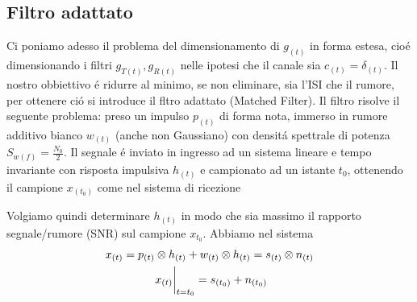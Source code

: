     \subsection{Filtro adattato}
        Ci poniamo adesso il problema del dimensionamento di $g_{(t)}$ in forma estesa, cioé
        dimensionando i filtri $g_{T(t)},g_{R(t)}$ nelle ipotesi che il canale sia $c_{(t)} = \delta_{(t)}$. 
        Il nostro obbiettivo é ridurre al minimo, se non eliminare, sia l'ISI che il rumore, per ottenere ció si introduce
        il fltro adattato (Matched Filter). Il filtro risolve il seguente problema: preso un impulso $p_{(t)}$ di forma nota,
        immerso in rumore additivo bianco $w_{(t)}$ (anche non Gaussiano) con densitá spettrale di potenza $S_{w(f)} = \frac{N_0}{2}$. 
        Il segnale é inviato in ingresso ad un sistema lineare e tempo invariante con risposta impulsiva $h_{(t)}$ e campionato ad un 
        istante $t_{0}$, ottenendo il campione $x_{(t_0)}$ come nel sistema di ricezione
        \begin{figure}[H]
            \centering
        \end{figure}        
        Volgiamo quindi determinare $h_{(t)}$ in modo che sia massimo il rapporto segnale/rumore (SNR) sul campione $x_{t_0}$. Abbiamo 
        nel sistema
        \begin{gather}
            x_{(t)} = p_{(t)}\otimes h_{(t)}+w_{(t)}\otimes h_{(t)} = s_{(t)}\otimes n_{(t)}\nonumber \\
            \eval*{x_{(t)}}_{t=t_0} = s_{(t_0)} + n_{(t_0)}\nonumber
        \end{gather}
